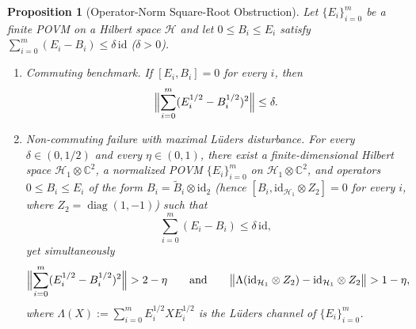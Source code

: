 \documentclass[11pt,a4paper]{article}
\newtheorem{proposition}[theorem]{Proposition}
\theoremstyle{definition}
\theoremstyle{remark}
\newcommand{\HH}{\mathcal{H}}
\newcommand{\CC}{\mathbb{C}}
\newcommand{\id}{\mathrm{id}}
\begin{document}
\begin{proposition}[Operator-Norm Square-Root Obstruction]\label{prop:sqrt-obstruction}
Let $\{E_i\}_{i=0}^m$ be a finite POVM on a Hilbert space $\HH$ and let $0\le B_i\le E_i$ satisfy $\sum_{i=0}^m (E_i - B_i)\le \delta\,\id$ ($\delta > 0$).
\begin{enumerate}[label=\textup{(\alph*)},leftmargin=*]
\item \emph{Commuting benchmark.} If $[E_i, B_i] = 0$ for every $i$, then
\[
\Bigl\|\sum_{i=0}^m (E_i^{1/2} - B_i^{1/2})^2\Bigr\| \le \delta.
\]
\item \emph{Non-commuting failure with maximal L\"uders disturbance.} For every $\delta\in(0,1/2)$ and every $\eta\in(0,1)$, there exist a finite-dimensional Hilbert space $\HH_1\otimes\CC^2$, a normalized POVM $\{E_i\}_{i=0}^m$ on $\HH_1\otimes\CC^2$, and operators $0\le B_i\le E_i$ of the form $B_i = \widetilde{B}_i\otimes\id_2$ (hence $[B_i, \id_{\HH_1}\otimes Z_2] = 0$ for every $i$, where $Z_2=\operatorname{diag}(1,-1)$) such that
\[
\sum_{i=0}^m (E_i - B_i) \le \delta\,\id,
\]
yet simultaneously
\begin{equation}\label{eq:sqrt-fail}
\Bigl\|\sum_{i=0}^m (E_i^{1/2} - B_i^{1/2})^2\Bigr\| > 2 - \eta
\qquad\text{and}\qquad
\bigl\|\Lambda(\id_{\HH_1}\otimes Z_2) - \id_{\HH_1}\otimes Z_2\bigr\| > 1 - \eta,
\end{equation}
where $\Lambda(X) := \sum_{i=0}^m E_i^{1/2} X E_i^{1/2}$ is the L\"uders channel of $\{E_i\}_{i=0}^m$.
\end{enumerate}
\end{proposition}
\end{document}
